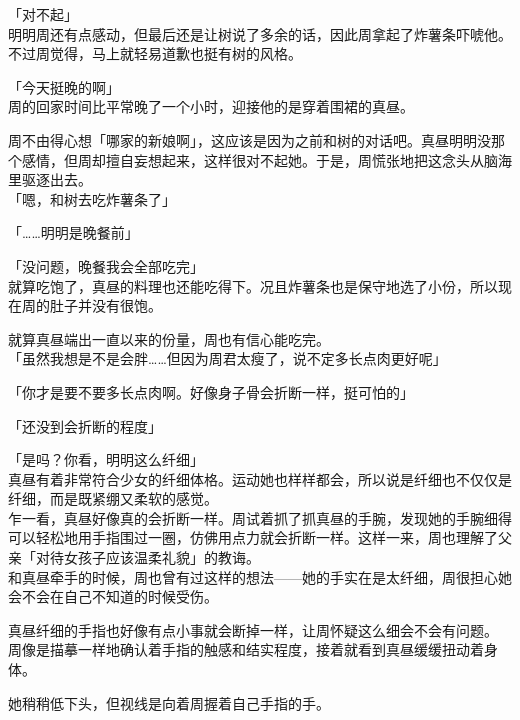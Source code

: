 「对不起」\\

明明周还有点感动，但最后还是让树说了多余的话，因此周拿起了炸薯条吓唬他。不过周觉得，马上就轻易道歉也挺有树的风格。\\

\vspace{2\baselineskip}

「今天挺晚的啊」\\

周的回家时间比平常晚了一个小时，迎接他的是穿着围裙的真昼。

周不由得心想「哪家的新娘啊」，这应该是因为之前和树的对话吧。真昼明明没那个感情，但周却擅自妄想起来，这样很对不起她。于是，周慌张地把这念头从脑海里驱逐出去。\\

「嗯，和树去吃炸薯条了」

「……明明是晚餐前」

「没问题，晚餐我会全部吃完」\\

就算吃饱了，真昼的料理也还能吃得下。况且炸薯条也是保守地选了小份，所以现在周的肚子并没有很饱。

就算真昼端出一直以来的份量，周也有信心能吃完。\\

「虽然我想是不是会胖……但因为周君太瘦了，说不定多长点肉更好呢」

「你才是要不要多长点肉啊。好像身子骨会折断一样，挺可怕的」

「还没到会折断的程度」

「是吗？你看，明明这么纤细」\\

真昼有着非常符合少女的纤细体格。运动她也样样都会，所以说是纤细也不仅仅是纤细，而是既紧绷又柔软的感觉。\\

乍一看，真昼好像真的会折断一样。周试着抓了抓真昼的手腕，发现她的手腕细得可以轻松地用手指围过一圈，仿佛用点力就会折断一样。这样一来，周也理解了父亲「对待女孩子应该温柔礼貌」的教诲。\\

和真昼牵手的时候，周也曾有过这样的想法——她的手实在是太纤细，周很担心她会不会在自己不知道的时候受伤。

真昼纤细的手指也好像有点小事就会断掉一样，让周怀疑这么细会不会有问题。\\

周像是描摹一样地确认着手指的触感和结实程度，接着就看到真昼缓缓扭动着身体。

她稍稍低下头，但视线是向着周握着自己手指的手。\\

